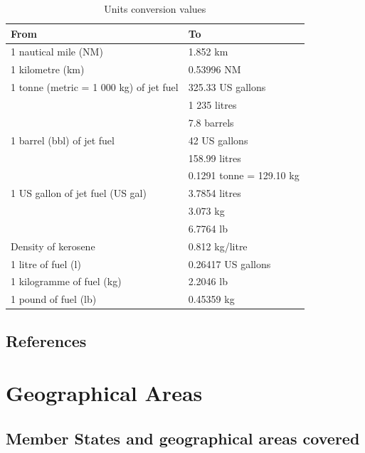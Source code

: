 \documentclass[
  11pt,
  a4paper,
]{book}
\begin{document}

\hypertarget{tbl-conversion-values}{}
\begin{longtable}{ll}
\caption{\label{tbl-conversion-values}Units conversion values }\tabularnewline

\toprule
From & To \\ 
\midrule
1 nautical mile (NM) & 1.852 km \\ 
1 kilometre (km) & 0.53996 NM \\ 
1 tonne (metric = 1 000 kg) of jet fuel & 325.33 US gallons \\ 
 & 1 235 litres \\ 
 & 7.8 barrels \\ 
1 barrel (bbl) of jet fuel & 42 US gallons \\ 
 & 158.99 litres \\ 
 & 0.1291 tonne = 129.10 kg \\ 
1 US gallon of jet fuel (US gal) & 3.7854 litres \\ 
 & 3.073 kg \\ 
 & 6.7764 lb \\ 
Density of kerosene & 0.812 kg/litre \\ 
1 litre of fuel (l) & 0.26417 US gallons \\ 
1 kilogramme of fuel (kg) & 2.2046 lb \\ 
1 pound of fuel (lb) & 0.45359 kg \\ 
\bottomrule
\end{longtable}

\hypertarget{references}{%
\section*{References}\label{references}}



\hypertarget{sec-geographical-areas}{%
\chapter*{Geographical Areas}\label{sec-geographical-areas}}


\hypertarget{member-states-and-geographical-areas-covered}{%
\section*{Member States and geographical areas
covered}\label{member-states-and-geographical-areas-covered}}
\end{document}
